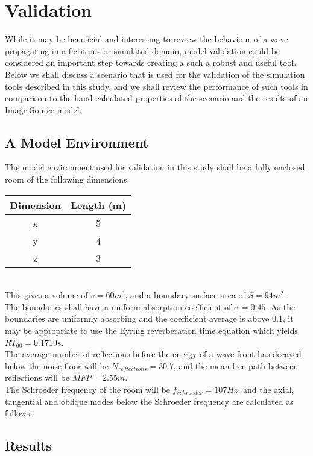 %
%
%
\chapter{Validation}
\label{Introduction}
While it may be beneficial and interesting to review the behaviour of a wave propagating in a fictitious or simulated domain, model validation could be considered an important step towards creating a such a robust and useful tool. Below we shall discuss a scenario that is used for the validation of the simulation tools described in this study, and we shall review the performance of such tools in comparison to the hand calculated properties of the scenario and the results of an Image Source model.  

\section{A Model Environment}
The model environment used for validation in this study shall be a fully enclosed room of the following dimensions:\\
\begin{tabular}{|c|c|} 
  \hline
 Dimension & Length (m) \\
 \hline
 x & 5 \\ 
 y & 4 \\  
 z & 3 \\  
 \hline
\end{tabular}\\
This gives a volume of $ v = 60m^3$, and a boundary surface area of $S = 94m^2$.\\
The boundaries shall have a uniform absorption coefficient of $\alpha = 0.45 $. As the boundaries are uniformly absorbing and the coefficient average is above 0.1, it may be appropriate to use the Eyring reverberation time equation which yields $RT_{60} = 0.1719s $.\\
The average number of reflections before the energy of a wave-front has decayed below the noise floor will be $N_{reflections} = 30.7$, and the mean free path between reflections will be $MFP = 2.55m$.\\
The Schroeder frequency of the room will be $f_{schroeder} = 107Hz $, and the axial, tangential and oblique modes below the Schroeder frequency are calculated as follows:\\




\section{Results}




